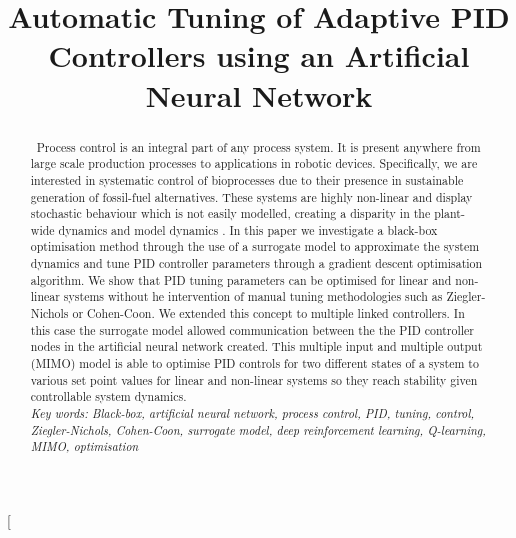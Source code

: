 \documentclass[conference]{IEEEtran}
\theoremstyle{definition}
\begin{document}
\title{Automatic Tuning of Adaptive PID Controllers using an Artificial Neural Network}


\author{
}




\pagestyle{plain}
\twocolumn[
    \begin{@twocolumnfalse}
    \pagestyle{plain}
    \maketitle
    \thispagestyle{plain}
    \end{@twocolumnfalse}
    \begin{abstract}
    ~{Process control is an integral part of any process system. It is present anywhere from large scale production processes to applications in robotic devices. Specifically, we are interested in systematic control of bioprocesses due to their presence in sustainable generation of fossil-fuel alternatives. These systems are highly non-linear and display stochastic behaviour which is not easily modelled, creating a disparity in the plant-wide dynamics and model dynamics \cite{Rio}. In this paper we investigate a black-box optimisation method through the use of a surrogate model to approximate the system dynamics and tune PID controller parameters through a gradient descent optimisation algorithm. We show that PID tuning parameters can be optimised for linear and non-linear systems without he intervention of manual tuning methodologies such as Ziegler-Nichols or Cohen-Coon. We extended this concept to multiple linked controllers. In this case the surrogate model allowed communication between the the PID controller nodes in the artificial neural network created. This multiple input and multiple output (MIMO) model is able to optimise PID controls for two different states of a system to various set point values for linear and non-linear systems so they reach stability given controllable system dynamics. \\

    \noindent \textit{Key words: Black-box, artificial neural network, process control, PID, tuning, control, Ziegler-Nichols, Cohen-Coon, surrogate model, deep reinforcement learning, Q-learning, MIMO, optimisation}}
    \end{abstract}
\end{document}
